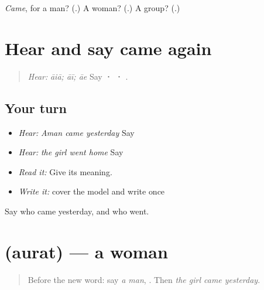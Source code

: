 \begin{tcolorbox}[breakable,colback=teal!4,colframe=teal!35!black,title={Before you move on}]
\emph{Came}, for a man? (\textbf{}.) A woman? (\textbf{}.) A group? (\textbf{}.)
\end{tcolorbox}
\section[\texorpdfstring{\pa{ਆਇਆ} · \pa{ਆਈ} · \pa{ਆਏ} (āiā · āī · āe)}{ਆਇਆ · ਆਈ · ਆਏ (āiā · āī · āe)}]{Hear and say came again}

\label{lesson:PA-C217-aaia-review}



\begin{quote}
\emph{Hear:} \emph{āiā; āī; āe} Say \textbf{ ·  · }.
\end{quote}

\subsection*{Your turn}
\begin{itemize}
\raggedright
  \item \emph{Hear:} \emph{Aman came yesterday} Say \textbf{  }
  \item \emph{Hear:} \emph{the girl went home} Say \textbf{  }
  \item \emph{Read it:} \textbf{  } Give its meaning.
  \item \emph{Write it:} cover the model and write \textbf{} once
\end{itemize}

\begin{tcolorbox}[breakable,colback=teal!4,colframe=teal!35!black,title={Before you move on}]
Say who came yesterday, and who went.
\end{tcolorbox}
\section[\texorpdfstring{\pa{ਔਰਤ} (aurat)}{ਔਰਤ (aurat)}]{ (aurat) — a woman}

\label{lesson:PA-C217-aurat}



\begin{quote}
Before the new word: say \emph{a man}, \textbf{}. Then \emph{the girl came yesterday}.
\end{quote}


